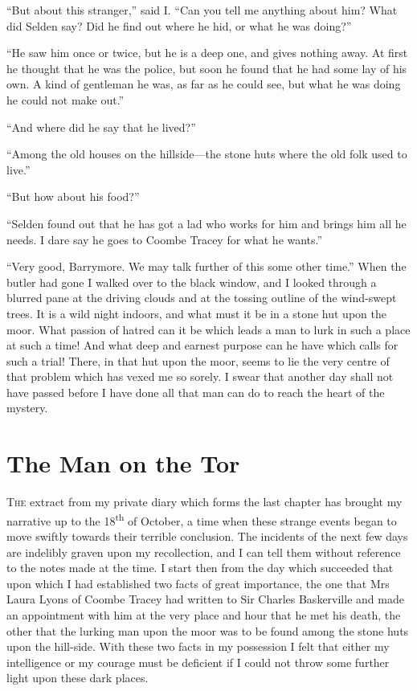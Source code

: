 \documentclass[paper=a5,BCOR=7mm,twoside,DIV=calc,12pt,usegeometry,openany,chapterprefix,endperiod,headings=big]{scrbook} %
\begin{document}
\enquote{But about this stranger,} said I. \enquote{Can you tell me anything about him? What did Selden say? Did he find out where he hid, or what he was doing?}

\enquote{He saw him once or twice, but he is a deep one, and gives nothing away. At first he thought that he was the police, but soon he found that he had some lay of his own. A kind of gentleman he was, as far as he could see, but what he was doing he could not make out.}

\enquote{And where did he say that he lived?}

\enquote{Among the old houses on the hillside---the stone huts where the old folk used to live.}

\enquote{But how about his food?}

\enquote{Selden found out that he has got a lad who works for him and brings him all he needs. I dare say he goes to Coombe Tracey for what he wants.}

\enquote{Very good, Barrymore. We may talk further of this some other time.} When the butler had gone I walked over to the black window, and I looked through a blurred pane at the driving clouds and at the tossing outline of the wind-swept trees. It is a wild night indoors, and what must it be in a stone hut upon the moor. What passion of hatred can it be which leads a man to lurk in such a place at such a time! And what deep and earnest purpose can he have which calls for such a trial! There, in that hut upon the moor, seems to lie the very centre of that problem which has vexed me so sorely. I swear that another day shall not have passed before I have done all that man can do to reach the heart of the mystery.


\chapter{The Man on the Tor}
\lettrine[lines=1]{T}{he} extract from my private diary which forms the last chap\-ter has brought my narrative up to the 18\textsuperscript{th} of October, a time when these strange events began to move swiftly towards their terrible conclusion. The incidents of the next few days are indelibly graven upon my recollection, and I can tell them without reference to the notes made at the time. I start then from the day which succeeded that upon which I had established two facts of great importance, the one that Mrs Laura Lyons of Coombe Tracey had written to Sir Charles Baskerville and made an appointment with him at the very place and hour that he met his death, the other that the lurking man upon the moor was to be found among the stone huts upon the hill-side. With these two facts in my possession I felt that either my intelligence or my courage must be deficient if I could not throw some further light upon these dark places.
\end{document}
